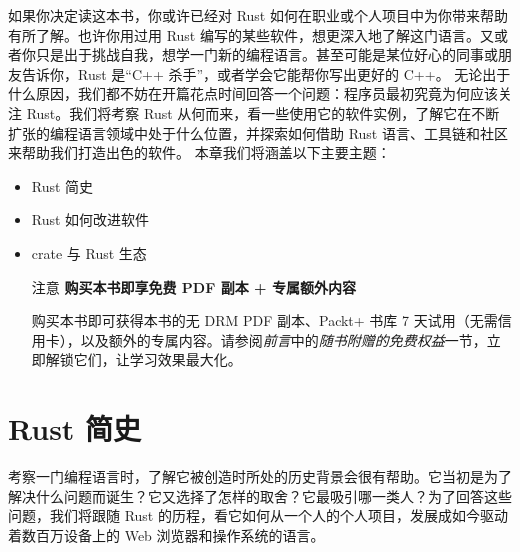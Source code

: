 如果你决定读这本书，你或许已经对 Rust 如何在职业或个人项目中为你带来帮助有所了解。也许你用过用 Rust 编写的某些软件，想更深入地了解这门语言。又或者你只是出于挑战自我，想学一门新的编程语言。甚至可能是某位好心的同事或朋友告诉你，Rust 是“C++ 杀手”，或者学会它能帮你写出更好的 C++。
无论出于什么原因，我们都不妨在开篇花点时间回答一个问题：程序员最初究竟为何应该关注 Rust。我们将考察 Rust 从何而来，看一些使用它的软件实例，了解它在不断扩张的编程语言领域中处于什么位置，并探索如何借助 Rust 语言、工具链和社区来帮助我们打造出色的软件。
本章我们将涵盖以下主要主题：
\begin{itemize}
  \item Rust 简史
  \item Rust 如何改进软件
  \item crate 与 Rust 生态
\begin{myNotic}{注意}
\textbf{购买本书即享免费 PDF 副本 + 专属额外内容}

购买本书即可获得本书的无 DRM PDF 副本、Packt+ 书库 7 天试用（无需信用卡），以及额外的专属内容。请参阅\emph{前言}中的\emph{随书附赠的免费权益}一节，立即解锁它们，让学习效果最大化。
\end{myNotic}
\end{itemize}
\section{Rust 简史}
\label{idx:idx_cea019cd}
考察一门编程语言时，了解它被创造时所处的历史背景会很有帮助。它当初是为了解决什么问题而诞生？它又选择了怎样的取舍？它最吸引哪一类人？为了回答这些问题，我们将跟随 Rust 的历程，看它如何从一个人的个人项目，发展成如今驱动着数百万设备上的 Web 浏览器和操作系统的语言。
